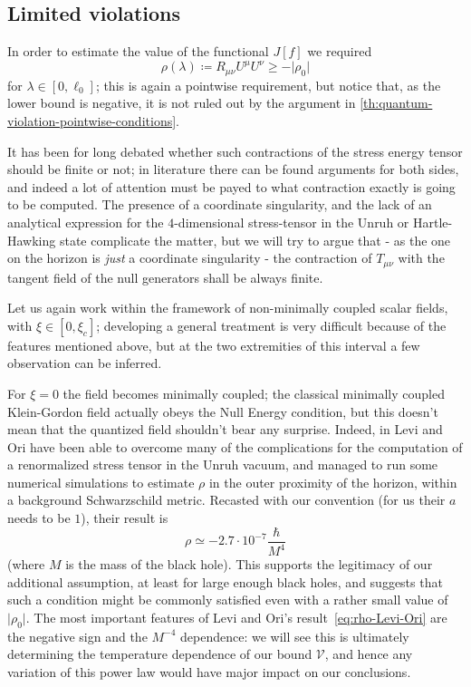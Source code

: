 \subsection{Limited violations}
\label{subsec:rho-0-estimation}

In order to estimate the value of the functional \(J[f]\) we required 
\[
	\rho (\lambda)\coloneqq R_{\mu\nu}U^{\mu}U^{\nu}\ge -\vert\rho_0\vert
\] 
for \(\lambda\in [0, \ell_0]\); this is again a pointwise requirement, but notice that, as the lower bound is negative, it is not ruled out by the argument in \ref{th:quantum-violation-pointwise-conditions}.

It has been for long debated whether such contractions of the stress energy tensor should be finite or not; in literature there can be found arguments for both sides, and indeed a lot of attention must be payed to what contraction exactly is going to be computed. The presence of a coordinate singularity, and the lack of an analytical expression for the \(4\)-dimensional stress-tensor in the Unruh or Hartle-Hawking state complicate the matter, but we will try to argue that - as the one on the horizon is \emph{just} a coordinate singularity - the contraction of \(T_{\mu\nu}\) with the tangent field of the null generators shall be always finite.

Let us again work within the framework of non-minimally coupled scalar fields, with \(\xi\in[0,\xi_c]\); developing a general treatment is very difficult because of the features mentioned above, but at the two extremities of this interval  a few observation can be inferred.

For \(\xi = 0\) the field becomes minimally coupled; the classical minimally coupled Klein-Gordon field actually obeys the Null Energy condition, but this doesn't mean that the quantized field shouldn't bear any surprise.
Indeed, in \cite{levi2016versatile} Levi and Ori have been able to overcome many of the complications for the computation of a renormalized stress tensor in the Unruh vacuum, and managed to run some numerical simulations to estimate \(\rho\) in the outer proximity of the horizon, within a background Schwarzschild metric. 
Recasted with our convention (for us their \(a\) needs to be \(1\)), their result is 
\begin{equation}
	\label{eq:rho-Levi-Ori}
	\rho \simeq -2.7\cdot 10^{-7} \frac{\hbar}{M^{4}} 
\end{equation}
(where \(M\) is the mass of the black hole). This supports the legitimacy of our additional assumption, at least for large enough black holes, and suggests that such a condition might be commonly satisfied even with a rather small value of \(\vert\rho_0\vert\). The most important features of Levi and Ori's result~\eqref{eq:rho-Levi-Ori} are the negative sign and the \(M^{-4}\) dependence: we will see this is ultimately determining the temperature dependence of our bound \(\mathcal{V}\), and hence any variation of this power law would have major impact on our conclusions.

